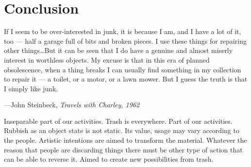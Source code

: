 \chapter{Conclusion}





%
%
\begin{singlespace}
\epigraph{If I seem to be over-interested in junk, it is because I am, and I have a lot of it, too --- half a garage full of bits and broken pieces. I use these things for repairing other things\ldots But it can be seen that I do have a genuine and almost miserly interest in worthless objects. My excuse is that in this era of planned obsolescence, when a thing breaks I can usually find something in my collection to repair it --- a toilet, or a motor, or a lawn mower. But I guess the truth is that I simply like junk.}{\hfill---John Steinbeck, \textit{Travels with Charley, 1962}}
\end{singlespace}




Inseparable part of our activities.
Trash is everywhere. Part of our activities. Rubbish as an object state is not static. Its value, usage may vary according to the people. Artistic intentions are aimed to transform the material. Whatever the reason that people are discarding things there must be other type of action that can be able to reverse it. Aimed to create new possibilities from trash.





